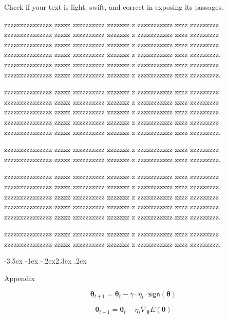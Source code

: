 \documentclass[prl,twocolumn]{revtex4-1}
\makeatletter
\renewcommand{\section}{\@startsection{section}{1}{\z@}%
	{-3.5ex \@plus -1ex \@minus -.2ex}{2.3ex \@plus.2ex}%
	{\normalfont\bfseries\raggedright}}
\numberwithin{equation}{section}
\makeatother
\begin{document}
Check if your text is light, swift, and correct in exposing its passages.

  zzzzzzzzzzzzzzz zzzzz zzzzzzzzzz zzzzzzz z zzzzzzzzzzz zzzz zzzzzzzzz
  zzzzzzzzzzzzzzz zzzzz zzzzzzzzzz zzzzzzz z zzzzzzzzzzz zzzz zzzzzzzzz
  zzzzzzzzzzzzzzz zzzzz zzzzzzzzzz zzzzzzz z zzzzzzzzzzz zzzz zzzzzzzzz
  zzzzzzzzzzzzzzz zzzzz zzzzzzzzzz zzzzzzz z zzzzzzzzzzz zzzz zzzzzzzzz.
  zzzzzzzzzzzzzzz zzzzz zzzzzzzzzz zzzzzzz z zzzzzzzzzzz zzzz zzzzzzzzz
  zzzzzzzzzzzzzzz zzzzz zzzzzzzzzz zzzzzzz z zzzzzzzzzzz zzzz zzzzzzzzz.

  
  zzzzzzzzzzzzzzz zzzzz zzzzzzzzzz zzzzzzz z zzzzzzzzzzz zzzz zzzzzzzzz
  zzzzzzzzzzzzzzz zzzzz zzzzzzzzzz zzzzzzz z zzzzzzzzzzz zzzz zzzzzzzzz
  zzzzzzzzzzzzzzz zzzzz zzzzzzzzzz zzzzzzz z zzzzzzzzzzz zzzz zzzzzzzzz
  zzzzzzzzzzzzzzz zzzzz zzzzzzzzzz zzzzzzz z zzzzzzzzzzz zzzz zzzzzzzzz
  zzzzzzzzzzzzzzz zzzzz zzzzzzzzzz zzzzzzz z zzzzzzzzzzz zzzz zzzzzzzzz.
  
  zzzzzzzzzzzzzzz zzzzz zzzzzzzzzz zzzzzzz z zzzzzzzzzzz zzzz zzzzzzzzz
  zzzzzzzzzzzzzzz zzzzz zzzzzzzzzz zzzzzzz z zzzzzzzzzzz zzzz zzzzzzzzz.

  
  
  zzzzzzzzzzzzzzz zzzzz zzzzzzzzzz zzzzzzz z zzzzzzzzzzz zzzz zzzzzzzzz
  zzzzzzzzzzzzzzz zzzzz zzzzzzzzzz zzzzzzz z zzzzzzzzzzz zzzz zzzzzzzzz
  zzzzzzzzzzzzzzz zzzzz zzzzzzzzzz zzzzzzz z zzzzzzzzzzz zzzz zzzzzzzzz
  zzzzzzzzzzzzzzz zzzzz zzzzzzzzzz zzzzzzz z zzzzzzzzzzz zzzz zzzzzzzzz
  zzzzzzzzzzzzzzz zzzzz zzzzzzzzzz zzzzzzz z zzzzzzzzzzz zzzz zzzzzzzzz.
  
  zzzzzzzzzzzzzzz zzzzz zzzzzzzzzz zzzzzzz z zzzzzzzzzzz zzzz zzzzzzzzz
  zzzzzzzzzzzzzzz zzzzz zzzzzzzzzz zzzzzzz z zzzzzzzzzzz zzzz zzzzzzzzz.

  

\section{Appendix}

\begin{equation}
	\boldsymbol{\theta}_{t+1}=\boldsymbol{\theta}_t-\gamma\cdot{\eta_t}\cdot{\mathsf{sign}(\boldsymbol{\theta})}
	\label{eq:regu}
\end{equation}

\begin{equation}
	\boldsymbol{\theta}_{t+1}=\boldsymbol{\theta}_t-\eta_t\nabla_{\boldsymbol{\theta}}{E(\boldsymbol{\theta})}
\label{eq:sgd}
\end{equation}
\end{document}
